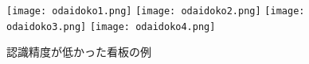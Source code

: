   \begin{figure}[tb]
    \centerline{
      \texttt{[image: odaidoko1.png]}
      \texttt{[image: odaidoko2.png]}
      \texttt{[image: odaidoko3.png]}
      \texttt{[image: odaidoko4.png]}
    }
    \caption{認識精度が低かった看板の例}
    \label{figure:recog_discussion}
  \end{figure}
